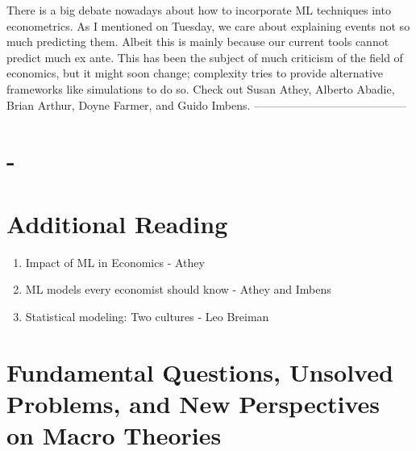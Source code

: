 \documentclass[10pt]{article}
\begin{document}
There is a big debate nowadays about how to incorporate ML techniques into econometrics. As I mentioned on Tuesday, we care about explaining events not so much predicting them. Albeit this is mainly because our current tools cannot predict much ex ante. This has been the subject of much criticism of the field of economics, but it might soon change; complexity tries to provide alternative frameworks like simulations to do so. Check out Susan Athey, Alberto Abadie, Brian Arthur, Doyne Farmer, and Guido Imbens.
-----------------------------------------

\section*{-}
\section*{Additional Reading}
\begin{enumerate}
  \item Impact of ML in Economics - Athey
  \item ML models every economist should know - Athey and Imbens
  \item Statistical modeling: Two cultures - Leo Breiman
\end{enumerate}

\section*{Fundamental Questions, Unsolved Problems, and New Perspectives on Macro Theories}
\end{document}
